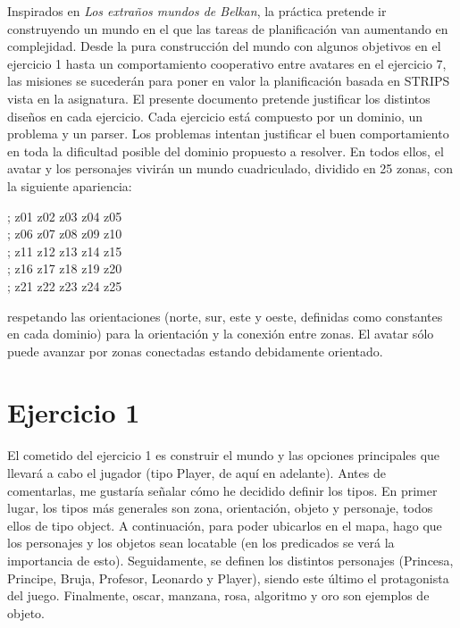 Inspirados en \textit{Los extraños mundos de Belkan}, la práctica pretende ir construyendo un mundo en el que las tareas de planificación van aumentando en complejidad. Desde la pura construcción del mundo con algunos objetivos en el ejercicio 1 hasta un comportamiento cooperativo entre avatares en el ejercicio 7, 
las misiones se sucederán para poner en valor la planificación basada en STRIPS vista en la asignatura. El presente documento pretende justificar los distintos diseños en cada ejercicio. Cada ejercicio está compuesto por un dominio, un problema y un parser. Los problemas intentan justificar el buen comportamiento en toda la dificultad posible del dominio propuesto a resolver. En todos ellos, el avatar y los personajes vivirán un mundo cuadriculado, dividido en 25 zonas, con la siguiente apariencia:
\begin{center}
	\centering
	; z01  z02  z03  z04  z05 \\
	; z06  z07  z08  z09  z10 \\
	; z11 z12 z13 z14 z15 \\
	; z16 z17 z18 z19 z20 \\
	; z21 z22 z23 z24 z25 \\
\end{center}

respetando las orientaciones (norte, sur, este y oeste, definidas como constantes en cada dominio) para la orientación y la conexión entre zonas. El avatar sólo puede avanzar por zonas conectadas estando debidamente orientado.

\section{Ejercicio 1}

El cometido del ejercicio 1 es construir el mundo y las opciones principales que llevará a cabo el jugador (tipo Player, de aquí en adelante). Antes de comentarlas, me gustaría señalar cómo he decidido definir los tipos. En primer lugar, los tipos más generales son zona, orientación, objeto y personaje, todos ellos de tipo object. A continuación, para poder ubicarlos en el mapa, hago que los personajes y los objetos sean locatable (en los predicados se verá la importancia de esto). Seguidamente, se definen los distintos personajes (Princesa, Principe, Bruja, Profesor, Leonardo y Player), siendo este último el protagonista del juego. Finalmente, oscar, manzana, rosa, algoritmo y oro son ejemplos de objeto. \\

